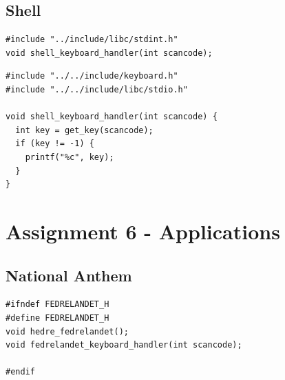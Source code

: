 \documentclass[../main.tex]{subfiles}
\begin{document}
\subsection{Shell}
\label{apx:shell}


\label{lst:shell_h}
\begin{verbatim}
#include "../include/libc/stdint.h"
void shell_keyboard_handler(int scancode);

\end{verbatim}


\label{lst:shell_c}
\begin{verbatim}
#include "../../include/keyboard.h"
#include "../../include/libc/stdio.h"

void shell_keyboard_handler(int scancode) {
  int key = get_key(scancode);
  if (key != -1) {
    printf("%c", key);
  }
}

\end{verbatim}


\section{Assignment 6 - Applications}
\label{apx:assignment_6___applications}


\subsection{National Anthem}
\label{apx:national_anthem}


\label{lst:fedrelandet_h}
\begin{verbatim}
#ifndef FEDRELANDET_H
#define FEDRELANDET_H
void hedre_fedrelandet();
void fedrelandet_keyboard_handler(int scancode);

#endif

\end{verbatim}
\end{document}
